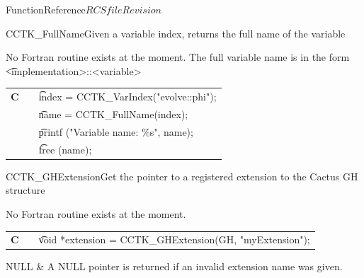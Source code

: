 \begin{cactuspart}{FunctionReference}{$RCSfile$}{$Revision$}
\begin{CCTKFunc}{CCTK\_FullName}{Given a variable index, returns the full name of the variable}
\begin{discussion}
No Fortran routine exists at the moment. The full variable name is in
the form {\t <implementation>::<variable>}
\end{discussion}
\begin{examples}
\begin{tabular}{@{}p{3cm}cp{11cm}}
\hfill {\bf C} && {\t index = CCTK\_VarIndex("evolve::phi");}\\
               && {\t name = CCTK\_FullName(index);}\\
               && {\t printf ("Variable name: \%s", name);}\\
               && {\t free (name);}
\\
\end{tabular}
\end{examples}
\begin{errorcodes}
\end{errorcodes}
\end{CCTKFunc}





\begin{CCTKFunc}{CCTK\_GHExtension}{Get the pointer to a registered extension to the Cactus GH structure}
\label{CCTK-GHExtension}
\showcargs
\begin{params}
\end{params}
\begin{discussion}
No Fortran routine exists at the moment.
\end{discussion}
\begin{examples}
\begin{tabular}{@{}p{3cm}cp{11cm}}
\hfill {\bf C} && {\t void *extension = CCTK\_GHExtension(GH, "myExtension");}
\\
\end{tabular}
\end{examples}
\begin{errorcodes}
NULL    & A NULL pointer is returned if an invalid extension name was given.
\end{errorcodes}
\end{CCTKFunc}


\end{cactuspart}
